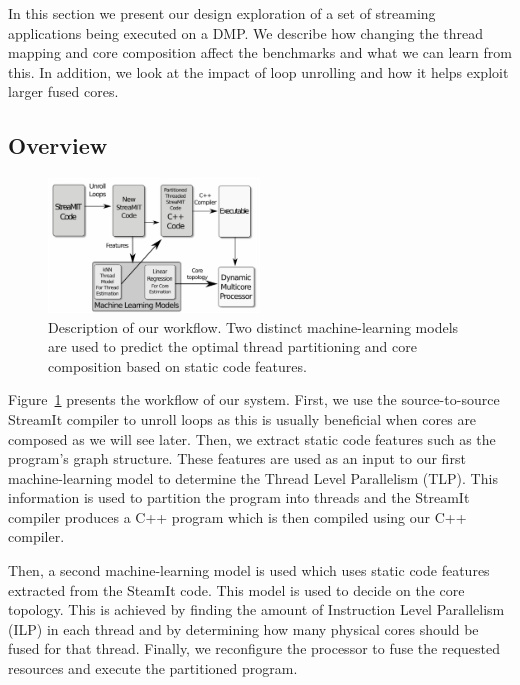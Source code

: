 In this section we present our design exploration of a set of streaming applications being executed on a DMP.
We describe how changing the thread mapping and core composition affect the benchmarks and what we can learn from this.
In addition, we look at the impact of loop unrolling and how it helps exploit larger fused cores.

\subsection{Overview}

\begin{figure}[t]
    \centering
    \includegraphics[width=0.5\textwidth]{graphics/explanation.pdf}
    \caption{Description of our workflow.
    Two distinct machine-learning models are used to predict the optimal thread partitioning and core composition based on static code features.}
\vspace{-5mm}
    \label{fig:overview}
\end{figure}

Figure~\ref{fig:overview} presents the workflow of our system.
First, we use the source-to-source StreamIt compiler to unroll loops as this is usually beneficial when cores are composed as we will see later.
Then, we extract static code features such as the program's graph structure.
These features are used as an input to our first machine-learning model to determine the Thread Level Parallelism (TLP).
This information is used to partition the program into threads and the StreamIt compiler produces a C++ program which  is then compiled using our C++ compiler.

Then, a second machine-learning model is used which uses static code features extracted from the SteamIt code.
This model is used to decide on the core topology.
This is achieved by finding the amount of Instruction Level Parallelism (ILP) in each thread and by determining how many physical cores should be fused for that thread.
Finally, we reconfigure the processor to fuse the requested resources and execute the partitioned program.


